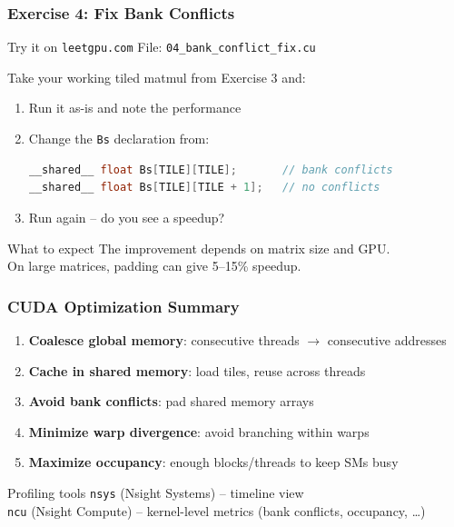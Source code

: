 \documentclass[aspectratio=169]{beamer}
\begin{document}
\begin{frame}[fragile]
	\frametitle{Exercise 4: Fix Bank Conflicts}
	\begin{block}{Try it on \texttt{leetgpu.com}}
		File: \texttt{04\_bank\_conflict\_fix.cu}
	\end{block}
	\vspace{0.5em}
	Take your working tiled matmul from Exercise 3 and:
	\begin{enumerate}
		\item Run it as-is and note the performance
		\item Change the \texttt{Bs} declaration from:
		      \begin{lstlisting}[language=C]
__shared__ float Bs[TILE][TILE];       // bank conflicts
__shared__ float Bs[TILE][TILE + 1];   // no conflicts
		      \end{lstlisting}
		\item Run again -- do you see a speedup?
	\end{enumerate}
	\vspace{0.3em}
	\begin{exampleblock}{What to expect}
		The improvement depends on matrix size and GPU. \\
		On large matrices, padding can give 5--15\% speedup.
	\end{exampleblock}
\end{frame}

\begin{frame}
	\frametitle{CUDA Optimization Summary}
	\begin{enumerate}
		\item \textbf{Coalesce global memory}: consecutive threads $\rightarrow$ consecutive addresses
		\item \textbf{Cache in shared memory}: load tiles, reuse across threads
		\item \textbf{Avoid bank conflicts}: pad shared memory arrays
		\item \textbf{Minimize warp divergence}: avoid branching within warps
		\item \textbf{Maximize occupancy}: enough blocks/threads to keep SMs busy
	\end{enumerate}
	\vspace{0.5em}
	\begin{block}{Profiling tools}
		\texttt{nsys} (Nsight Systems) -- timeline view \\
		\texttt{ncu} (Nsight Compute) -- kernel-level metrics (bank conflicts, occupancy, \ldots)
	\end{block}
\end{frame}
\end{document}
